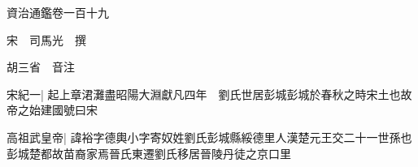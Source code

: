 






























































資治通鑑卷一百十九

宋　司馬光　撰

胡三省　音注

宋紀一|{
	起上章涒灘盡昭陽大淵獻凡四年　劉氏世居彭城彭城於春秋之時宋土也故帝之始建國號曰宋}


高祖武皇帝|{
	諱裕字德輿小字寄奴姓劉氏彭城縣綏德里人漢楚元王交二十一世孫也彭城楚都故苗裔家焉晉氏東遷劉氏移居晉陵丹徒之京口里}



